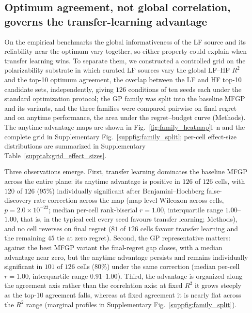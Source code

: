 \documentclass[11pt,a4paper]{article}%
\begin{document}
\subsection{Optimum agreement, not global correlation, governs the transfer-learning
advantage}\label{sec:res-grid}

On the empirical benchmarks the global informativeness of the LF source and
its reliability near the optimum vary together, so either property could explain when
transfer learning wins. To separate them, we constructed a controlled grid on the
polarizability substrate in which curated LF sources vary the global LF--HF
$R^2$ and the top-10 optimum agreement, the overlap between the LF and HF
top-10 candidate sets, independently, giving $126$ conditions of ten seeds each under
the standard optimization protocol; the GP family was split into the
baseline MFGP and its variants, and the three families were compared pairwise on final
regret and on anytime performance, the area under the regret--budget curve (Methods).
The anytime-advantage maps are shown in Fig.~\ref{fig:family_heatmap}l--n and the
complete grid in Supplementary Fig.~\ref{suppfig:family_split}; per-cell effect-size
distributions are summarized in Supplementary Table~\ref{supptab:grid_effect_sizes}.

Three observations emerge. First, transfer learning dominates the baseline MFGP across
the entire plane: its anytime advantage is positive in $126$ of $126$ cells, with
$120$ of $126$ ($95\%$) individually significant after Benjamini--Hochberg
false-discovery-rate correction across the map (map-level Wilcoxon across cells,
$p = 2.0\times10^{-22}$; median per-cell rank-biserial $r = 1.00$, interquartile range
$1.00$--$1.00$, that is, in the typical cell every seed favours transfer learning;
Methods), and no cell reverses on final regret ($81$ of $126$ cells favour transfer
learning and the remaining $45$ tie at zero regret). Second,
the GP representative matters: against the best MFGP variant the
final-regret gap closes, with a median advantage near zero, but the anytime advantage
persists and remains individually significant in $101$ of $126$ cells ($80\%$) under
the same correction (median per-cell $r = 1.00$,
interquartile range $0.91$--$1.00$). Third, the advantage is organized
along the agreement axis rather than the correlation axis: at fixed $R^2$ it grows
steeply as the top-10 agreement falls, whereas at fixed agreement it is nearly flat
across the $R^2$ range (marginal profiles in Supplementary
Fig.~\ref{suppfig:family_split}).
\end{document}
